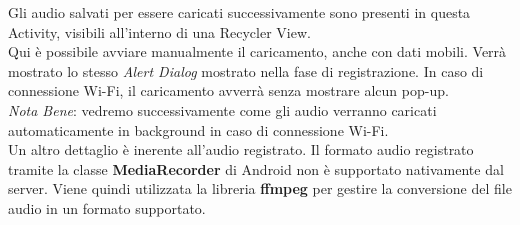 \documentclass{article}
\begin{document}
\begin{minipage}[t]{0.6\textwidth}
    \raggedright
    \vspace*{20pt}
    Gli audio salvati per essere caricati successivamente sono presenti in questa Activity, visibili all'interno di una Recycler View.\\
    Qui è possibile avviare manualmente il caricamento, anche con dati mobili. Verrà mostrato lo stesso \textit{Alert Dialog} mostrato nella fase di registrazione. In caso di connessione Wi-Fi, il caricamento avverrà senza mostrare alcun pop-up.\vspace*{14pt}\\
    \textit{Nota Bene}: vedremo successivamente come gli audio verranno caricati automaticamente in background in caso di connessione Wi-Fi.\vspace*{14pt}\\
    Un altro dettaglio è inerente all'audio registrato. Il formato audio registrato tramite la classe \textbf{MediaRecorder} di Android non è supportato nativamente dal server. Viene quindi utilizzata la libreria \textbf{ffmpeg} per gestire la conversione del file audio in un formato supportato.
\end{minipage}
\end{document}
